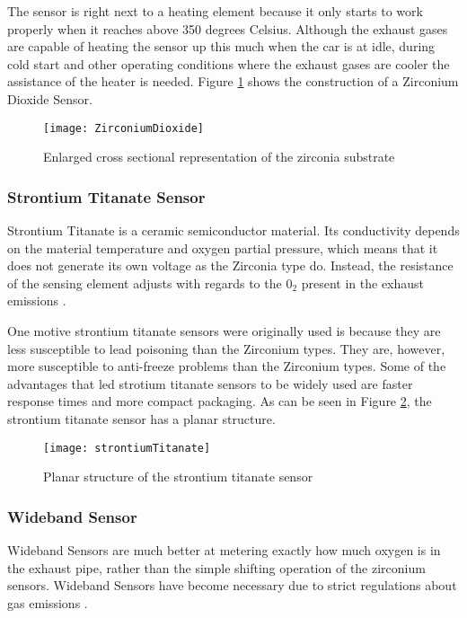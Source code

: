 The sensor is right next to a heating element because it only starts to work properly when it reaches above 350 degrees Celsius. Although the exhaust gases are capable of heating the sensor up this much when the car is at idle, during cold start and other operating conditions where the exhaust gases are cooler the assistance of the heater is needed.
Figure \ref{fig:Zirconium}  shows the construction of a Zirconium Dioxide Sensor.


\begin{figure}[ht!]
    \centering
    \texttt{[image: ZirconiumDioxide]}
    \caption{Enlarged cross sectional representation of the zirconia substrate \cite{zirconia}}
    \label{fig:Zirconium}
\end{figure}


\subsubsection*{Strontium Titanate Sensor}
Strontium Titanate is a ceramic semiconductor material. Its conductivity depends on the material temperature and oxygen partial pressure, which means that it does not generate its own voltage as the Zirconia type do. Instead, the resistance of the sensing element adjusts with regards to the $0_{2}$ present in the exhaust emissions  \cite{gerblinger1991fast}. 

One motive strontium titanate sensors were originally used is because they are less susceptible to lead poisoning than the Zirconium types. They are, however, more susceptible to anti-freeze problems than the Zirconium types.
Some of the advantages that led strotium titanate sensors to be widely used are faster response times and more compact packaging. As can be seen in Figure \ref{fig:strontiumTitanate}, the strontium titanate sensor has a planar structure.

\begin{figure}[H]
    \centering
    \texttt{[image: strontiumTitanate]}
    \caption{Planar structure of the strontium titanate sensor \cite{kiencke2005automotive}}
    \label{fig:strontiumTitanate}
\end{figure}

\subsubsection*{Wideband Sensor}
Wideband Sensors are much better at metering exactly how much oxygen is in the exhaust pipe, rather than the simple shifting operation of the zirconium sensors.
Wideband Sensors have become necessary due to strict regulations about gas emissions \cite{widebandarticle}.

